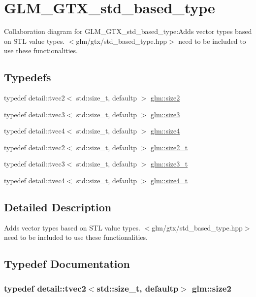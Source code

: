 \hypertarget{group__gtx__std__based__type}{
\section{GLM\_\-GTX\_\-std\_\-based\_\-type}
\label{group__gtx__std__based__type}
}


Collaboration diagram for GLM\_\-GTX\_\-std\_\-based\_\-type:Adds vector types based on STL value types. $<$glm/gtx/std\_\-based\_\-type.hpp$>$ need to be included to use these functionalities.  
\subsection*{Typedefs}
\begin{CompactItemize}
\item 
typedef detail::tvec2$<$ std::size\_\-t, defaultp $>$ \hyperlink{group__gtx__std__based__type_g393e8beba20ea33452384087a2864f86}{glm::size2}
\item 
typedef detail::tvec3$<$ std::size\_\-t, defaultp $>$ \hyperlink{group__gtx__std__based__type_ge1dda4cdccd4c1abeeb2e470c048d0c9}{glm::size3}
\item 
typedef detail::tvec4$<$ std::size\_\-t, defaultp $>$ \hyperlink{group__gtx__std__based__type_gc04a40cfe44b5035770cf26d98a9349d}{glm::size4}
\item 
typedef detail::tvec2$<$ std::size\_\-t, defaultp $>$ \hyperlink{group__gtx__std__based__type_g64be170f9203528ff59efa40b1977bb0}{glm::size2\_\-t}
\item 
typedef detail::tvec3$<$ std::size\_\-t, defaultp $>$ \hyperlink{group__gtx__std__based__type_gd9ddaab6dd4c37ba46b74a1423ef2ba3}{glm::size3\_\-t}
\item 
typedef detail::tvec4$<$ std::size\_\-t, defaultp $>$ \hyperlink{group__gtx__std__based__type_gaaf9b6a73135945e356601a01beece30}{glm::size4\_\-t}
\end{CompactItemize}


\subsection{Detailed Description}
Adds vector types based on STL value types. $<$glm/gtx/std\_\-based\_\-type.hpp$>$ need to be included to use these functionalities. 



\subsection{Typedef Documentation}
\hypertarget{group__gtx__std__based__type_g393e8beba20ea33452384087a2864f86}{
\subsubsection[size2]{\setlength{\rightskip}{0pt plus 5cm}typedef detail::tvec2$<$std::size\_\-t, defaultp$>$ {\bf glm::size2}}}
\label{group__gtx__std__based__type_g393e8beba20ea33452384087a2864f86}


